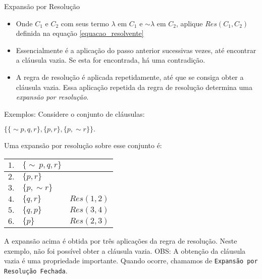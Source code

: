 \begin{frame}{Expansão por Resolução}

\begin{itemize}
\itemsep 0.7cm

\item Onde $C_1$ e $C_2$ com seus termo $\lambda $ em $C_1$ e $\sim \lambda $ em $C_2$, aplique  $Res(C_1,C_2)$ definida na equação \ref{equacao_resolvente}

\item Essencialmente é a aplicação do passo anterior sucessivas vezes, até encontrar a cláusula vazia. Se esta for encontrada, há uma contradição.

\item A regra de resolução é aplicada repetidamente, até que se consiga obter a cláusula vazia. Essa aplicação repetida da regra de resolução determina uma \textit{expansão por resolução}.

\end{itemize}

\end{frame}

\begin{frame}{Exemplos:}
Considere o conjunto de cláusulas:

$\{\{ \sim p, q, r\},\{p, r\},\{p, \sim r\}\}.$

Uma expansão por resolução sobre esse conjunto é:

\begin{table}
\centering
\begin{tabular}{r|l|r}
\hline
\hline
$1.$&$\{ \sim\ p, q, r\}$&$ $\\
\hline
$2.$&$\{p,r\}$&$ $\\
\hline
$3.$&$\{p,\sim r\}$&$ $\\
\hline
$4.$&$ \{q,r\}$&$Res(1,2)$\\
\hline
$5.$&$ \{q,p\}$&$Res(3,4)$\\
\hline
$6.$&$ \{p\}$&$Res(2,3)$\\
\hline
\hline
\end{tabular}
\end{table}

A expansão acima é obtida por três aplicações da regra de resolução. Neste exemplo, não foi possível obter a cláusula vazia.
OBS: A obtenção da cláusula vazia é uma propriedade importante. Quando ocorre, chamamos de \texttt{Expansão por Resolução Fechada}.

\end{frame}

